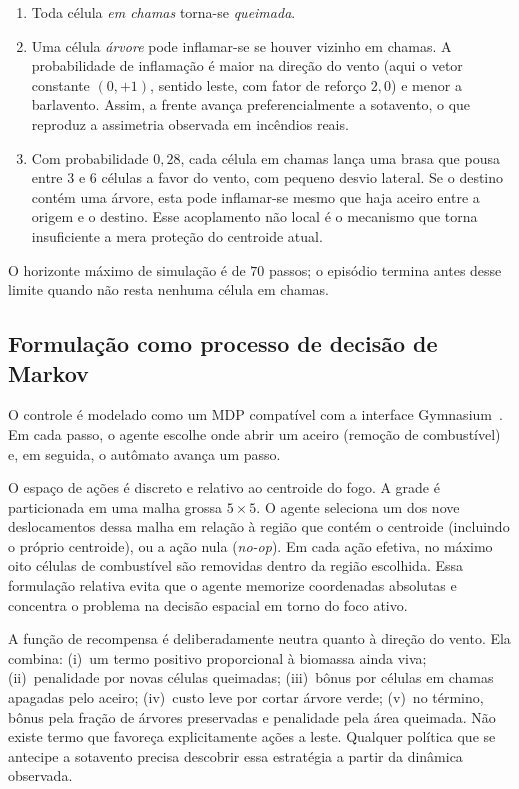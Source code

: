 \documentclass[11pt,a4paper]{article}
\begin{document}
\begin{enumerate}
  \item Toda célula \emph{em chamas} torna-se \emph{queimada}.
  \item Uma célula \emph{árvore} pode inflamar-se se houver vizinho em chamas.
        A probabilidade de inflamação é maior na direção do vento (aqui o
        vetor constante $(0,+1)$, sentido leste, com fator de reforço
        $2{,}0$) e menor a barlavento.
        Assim, a frente avança preferencialmente a sotavento, o que reproduz a
        assimetria observada em incêndios reais.
  \item Com probabilidade $0{,}28$, cada célula em chamas lança uma brasa que
        pousa entre $3$ e $6$ células a favor do vento, com pequeno desvio
        lateral.
        Se o destino contém uma árvore, esta pode inflamar-se mesmo que haja
        aceiro entre a origem e o destino.
        Esse acoplamento não local é o mecanismo que torna insuficiente a
        mera proteção do centroide atual.
\end{enumerate}

O horizonte máximo de simulação é de $70$ passos; o episódio termina antes
desse limite quando não resta nenhuma célula em chamas.

\subsection{Formulação como processo de decisão de Markov}
\label{sec:mdp}

O controle é modelado como um MDP compatível com a interface
Gymnasium~\cite{towers2023}.
Em cada passo, o agente escolhe onde abrir um aceiro (remoção de combustível)
e, em seguida, o autômato avança um passo.

O espaço de ações é discreto e relativo ao centroide do fogo.
A grade é particionada em uma malha grossa $5\times 5$.
O agente seleciona um dos nove deslocamentos dessa malha em relação à região
que contém o centroide (incluindo o próprio centroide), ou a ação nula
(\emph{no-op}).
Em cada ação efetiva, no máximo oito células de combustível são removidas
dentro da região escolhida.
Essa formulação relativa evita que o agente memorize coordenadas absolutas e
concentra o problema na decisão espacial em torno do foco ativo.

A função de recompensa é deliberadamente neutra quanto à direção do vento.
Ela combina: (i)~um termo positivo proporcional à biomassa ainda viva;
(ii)~penalidade por novas células queimadas; (iii)~bônus por células em chamas
apagadas pelo aceiro; (iv)~custo leve por cortar
árvore verde; (v)~no término, bônus pela fração de árvores preservadas e
penalidade pela área queimada.
Não existe termo que favoreça explicitamente ações a leste.
Qualquer política que se antecipe a sotavento precisa descobrir essa
estratégia a partir da dinâmica observada.
\end{document}
